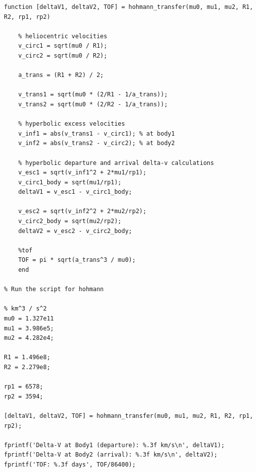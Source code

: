 \documentclass[conference]{IEEEtran}
\begin{document}
	\newpage
	
	\appendix
	\noindent\hfill
	\begin{minipage}{0.85\linewidth}
	\begin{lstlisting}[style=ieee-tight, caption={Hohmann Transfer Calculation MatLab}]
function [deltaV1, deltaV2, TOF] = hohmann_transfer(mu0, mu1, mu2, R1, R2, rp1, rp2)

	% heliocentric velocities
	v_circ1 = sqrt(mu0 / R1); 
	v_circ2 = sqrt(mu0 / R2); 
	
	a_trans = (R1 + R2) / 2; 
	
	v_trans1 = sqrt(mu0 * (2/R1 - 1/a_trans)); 
	v_trans2 = sqrt(mu0 * (2/R2 - 1/a_trans)); 
	
	% hyperbolic excess velocities
	v_inf1 = abs(v_trans1 - v_circ1); % at body1
	v_inf2 = abs(v_trans2 - v_circ2); % at body2
	
	% hyperbolic departure and arrival delta-v calculations
	v_esc1 = sqrt(v_inf1^2 + 2*mu1/rp1); 
	v_circ1_body = sqrt(mu1/rp1); 
	deltaV1 = v_esc1 - v_circ1_body;
	
	v_esc2 = sqrt(v_inf2^2 + 2*mu2/rp2);
	v_circ2_body = sqrt(mu2/rp2);
	deltaV2 = v_esc2 - v_circ2_body;
	
	%tof
	TOF = pi * sqrt(a_trans^3 / mu0);
	end
	
% Run the script for hohmann

% km^3 / s^2
mu0 = 1.327e11
mu1 = 3.986e5;  
mu2 = 4.282e4; 

R1 = 1.496e8;  
R2 = 2.279e8; 

rp1 = 6578;  
rp2 = 3594;  

[deltaV1, deltaV2, TOF] = hohmann_transfer(mu0, mu1, mu2, R1, R2, rp1, rp2);

fprintf('Delta-V at Body1 (departure): %.3f km/s\n', deltaV1);
fprintf('Delta-V at Body2 (arrival): %.3f km/s\n', deltaV2);
fprintf('TOF: %.3f days', TOF/86400);
	\end{lstlisting}
	\end{minipage}
	
\end{document}
